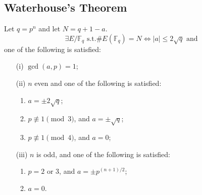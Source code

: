 \documentclass[10pt,final]{beamer} %
\newcommand{\F}{\mathbb F}
\theoremstyle{definition}
\begin{document}
\subsection{Waterhouse's Theorem}
\begin{frame}[label=current]
\begin{theorem}[Waterhouse]\pause
\label{lem:Water}
 Let $q=p^n$ and let $N = q + 1-a$.
 $$\exists E/\F_q\text{ s.t.}\#E(\F_q) = N\Leftrightarrow|a|\le 2\sqrt q\text{ and}$$
 one of the following is satisfied:\pause
\begin{itemize}[<+-| alert@+>]
\item[(i)] $\gcd(a, p) = 1$;
\item[(ii)] $n$ even and one of the following is satisfied:
\begin{enumerate}
  \item $a=\pm 2\sqrt q$;
  \item $p\not\equiv 1 \pmod 3$, and $a = \pm\sqrt q$;
  \item $p\not\equiv 1 \pmod 4$, and $a = 0$;
\end{enumerate}
\item[(iii)] $n$ is odd, and one of the following is satisfied:
 \begin{enumerate}
   \item $p = 2$ or $3$, and $a = \pm p^{(n+1)/2}$;
   \item $a = 0$.
 \end{enumerate}
 \end{itemize}
\end{theorem}


\end{frame}
\end{document}
